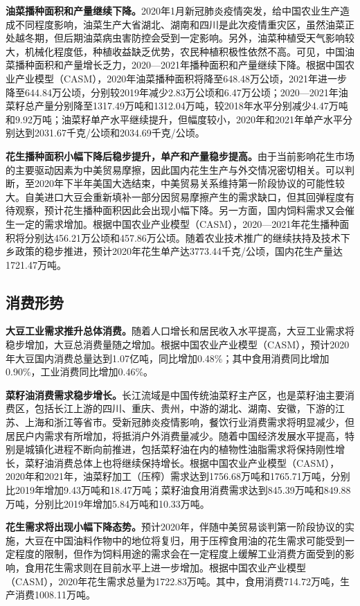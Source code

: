 \documentclass{progbookcn}
\begin{document}
\textbf{油菜播种面积和产量继续下降。}2020年1月新冠肺炎疫情突发，给中国农业生产造成不同程度影响，油菜生产大省湖北、湖南和四川是此次疫情重灾区，虽然油菜正处越冬期，但后期油菜病虫害防控会受到一定影响。另外，油菜种植受天气影响较大，机械化程度低，种植收益缺乏优势，农民种植积极性依然不高。可见，中国油菜播种面积和产量增长乏力，2020—2021年播种面积和产量继续下降。根据中国农业产业模型（CASM），2020年油菜播种面积将降至648.48万公顷，2021年进一步降至644.84万公顷，分别较2019年减少2.83万公顷和6.47万公顷；2020—2021年油菜籽总产量分别降至1317.49万吨和1312.04万吨，较2018年水平分别减少4.47万吨和9.92万吨；油菜籽单产水平继续提升，但幅度较小，2020年和2021年单产水平分别达到2031.67千克/公顷和2034.69千克/公顷。

\textbf{花生播种面积小幅下降后稳步提升，单产和产量稳步提高。}由于当前影响花生市场的主要驱动因素为中美贸易摩擦，因此国内花生生产与外交情况密切相关。可以判断，至2020年下半年美国大选结束，中美贸易关系维持第一阶段协议的可能性较大。自美进口大豆会重新填补一部分因贸易摩擦产生的需求缺口，但其回弹程度有待观察，预计花生播种面积因此会出现小幅下降。另一方面，国内饲料需求又会催生一定的需求增加。根据中国农业产业模型（CASM），2020—2021年花生播种面积将分别达456.21万公顷和457.86万公顷。随着农业技术推广的继续扶持及技术下乡政策的稳步推进，预计2020年花生单产达3773.44千克/公顷，国内花生产量达1721.47万吨。

\subsection{消费形势}

\textbf{大豆工业需求推升总体消费。}随着人口增长和居民收入水平提高，大豆工业需求将稳步增加，大豆总消费量随之增加。根据中国农业产业模型（CASM），预计2020年大豆国内消费总量达到1.07亿吨，同比增加0.48\%；其中食用消费同比增加0.90\%，工业消费同比增加0.46\%。

\textbf{菜籽油消费需求稳步增长。}长江流域是中国传统油菜籽主产区，也是菜籽油主要消费区，包括长江上游的四川、重庆、贵州，中游的湖北、湖南、安徽，下游的江苏、上海和浙江等省市。受新冠肺炎疫情影响，餐饮行业消费需求将明显减少，但居民户内需求有所增加，将抵消户外消费量减少。随着中国经济发展水平提高，特别是城镇化进程不断向前推进，包括菜籽油在内的植物性油脂需求将保持刚性增长，菜籽油消费总体上也将继续保持增长。根据中国农业产业模型（CASM），2020年和2021年，油菜籽加工（压榨）需求达到1756.68万吨和1765.71万吨，分别比2019年增加9.43万吨和18.47万吨；菜籽油食用消费需求达到845.39万吨和849.88万吨，分别比2019年增加5.84万吨和10.33万吨。

\textbf{花生需求将出现小幅下降态势。}预计2020年，伴随中美贸易谈判第一阶段协议的实施，大豆在中国油料作物中的地位将复归，用于压榨食用油的花生需求可能受到一定程度的限制，但作为饲料用途的需求会在一定程度上缓解工业消费方面受到的影响，食用花生需求则在目前水平上进一步增加。根据中国农业产业模型（CASM），2020年花生需求总量为1722.83万吨。其中，食用消费714.72万吨，生产消费1008.11万吨。
\end{document}
